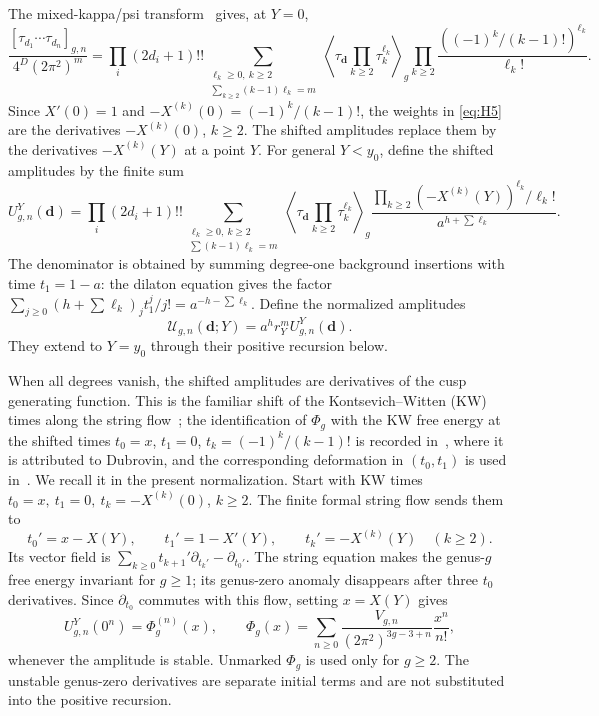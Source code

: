 The mixed-kappa/psi transform~\cite{KMZ,LX} gives, at
\(Y=0\), \begin{equation}
\frac{[\tau_{d_1}\cdots\tau_{d_n}]_{g,n}}
 {4^D(2\pi^2)^m}
=\prod_i(2d_i+1)!!
\sum_{\substack{\ell_k\ge0,\ k\ge2\\
                 \sum_{k\ge2}(k-1)\ell_k=m}}
\left\langle\tau_{\mathbf d}\prod_{k\ge2}\tau_k^{\ell_k}\right\rangle_g
\prod_{k\ge2}\frac{((-1)^k/(k-1)!)^{\ell_k}}{\ell_k!}.
\label{eq:H5}
\end{equation}
Since \(X'(0)=1\) and \(-X^{(k)}(0)=(-1)^k/(k-1)!\), the weights in
\eqref{eq:H5} are the derivatives \(-X^{(k)}(0)\), \(k\ge2\). The shifted
amplitudes replace them by the derivatives \(-X^{(k)}(Y)\) at a point
\(Y\). For general \(Y<y_0\), define the shifted amplitudes by the finite sum
\begin{equation}
U^Y_{g,n}(\mathbf d)=\prod_i(2d_i+1)!!
\sum_{\substack{\ell_k\ge0,\ k\ge2\\
                 \sum(k-1)\ell_k=m}}
\left\langle\tau_{\mathbf d}\prod_{k\ge2}\tau_k^{\ell_k}\right\rangle_g
\frac{\prod_{k\ge2}(-X^{(k)}(Y))^{\ell_k}/\ell_k!}
 {a^{h+\sum\ell_k}}.
\label{eq:H6}
\end{equation} The denominator is obtained by summing degree-one background
insertions with time \(t_1=1-a\): the dilaton equation gives the factor
\(\sum_{j\ge0}(h+\sum\ell_k)_j t_1^j/j!=a^{-h-\sum\ell_k}\). Define the
normalized amplitudes \begin{equation}
\mathcal U_{g,n}(\mathbf d;Y)=a^h r_Y^m U^Y_{g,n}(\mathbf d).
\label{eq:H7}
\end{equation} They extend to \(Y=y_0\) through their positive recursion below.

When all degrees vanish, the shifted amplitudes are derivatives of the
cusp generating function. This is the familiar shift of the Kontsevich--Witten (KW) times
along the string flow~\cite{IZ,KMZ}; the identification of $\Phi_g$ with the
KW free energy at the shifted times $t_0=x$, $t_1=0$, $t_k=(-1)^k/(k-1)!$
is recorded in~\cite[Remark~1]{Zog98}, where it is attributed to Dubrovin, and the corresponding deformation in
$(t_0,t_1)$ is used in~\cite[Section~2.4]{OS}. We recall it in the present
normalization. Start with KW
times \(t_0=x,\ t_1=0,\ t_k=-X^{(k)}(0)\), \(k\ge2\). The finite formal
string flow sends them to \[
t_0'=x-X(Y),\qquad t_1'=1-X'(Y),\qquad
t_k'=-X^{(k)}(Y)\quad(k\ge2).
\] Its vector field is
\(\sum_{k\ge0}t_{k+1}'\partial_{t_k'}-\partial_{t_0'}\). The string
equation makes the genus-\(g\) free energy invariant for \(g\ge1\); its
genus-zero anomaly disappears after three \(t_0\) derivatives. Since
\(\partial_{t_0}\) commutes with this flow, setting \(x=X(Y)\) gives \begin{equation}
U^Y_{g,n}(0^n)=\Phi_g^{(n)}(x),\qquad
\Phi_g(x)=\sum_{n\ge0}\frac{V_{g,n}}{(2\pi^2)^{3g-3+n}}\frac{x^n}{n!},
\label{eq:H8}
\end{equation} whenever the amplitude is stable. Unmarked \(\Phi_g\) is used only
for \(g\ge2\). The unstable genus-zero derivatives are separate initial
terms and are not substituted into the positive recursion.

